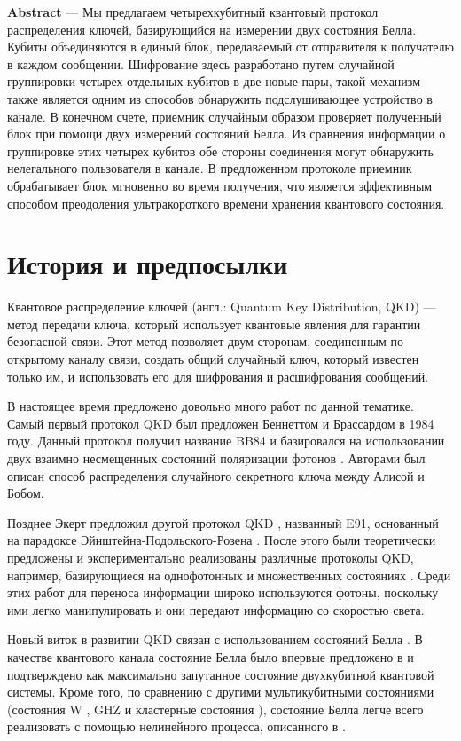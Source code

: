 \documentclass[a4paper,11pt]{article}
\author{Karamyshev}
\begin{document}
\textbf{Abstract} --- Мы предлагаем четырехкубитный квантовый протокол распределения ключей, базирующийся на измерении двух состояния Белла. Кубиты объединяются в единый блок, передаваемый от отправителя к получателю в каждом сообщении. Шифрование здесь разработано путем случайной группировки четырех отдельных кубитов в две новые пары, такой механизм также является одним из способов обнаружить подслушивающее устройство в канале. В конечном счете, приемник случайным образом проверяет полученный блок при помощи двух измерений состояний Белла. Из сравнения информации о группировке этих четырех кубитов обе стороны соединения могут обнаружить нелегального пользователя в канале. В предложенном протоколе приемник обрабатывает блок мгновенно во время получения, что является эффективным способом преодоления ультракороткого времени хранения квантового состояния.



\section{История и предпосылки}

Квантовое распределение ключей (англ.: Quantum Key Distribution, QKD) — метод передачи ключа, который использует квантовые явления для гарантии безопасной связи. Этот метод позволяет двум сторонам, соединенным по открытому каналу связи, создать общий случайный ключ, который известен только им, и использовать его для шифрования и расшифрования сообщений.


В настоящее время предложено довольно много работ по данной тематике. Самый первый протокол QKD был предложен Беннеттом и Брассардом в 1984 году. Данный протокол получил название BB84 и базировался на использовании двух взаимно несмещенных состояний поляризации фотонов \cite{BB84}. Авторами был описан способ распределения случайного секретного ключа между Алисой и Бобом. 
 
Позднее Экерт предложил другой протокол QKD \cite{E91}, названный E91, основанный на парадоксе Эйнштейна-Подольского-Розена \cite{EPR}. После этого были теоретически предложены и экспериментально реализованы различные протоколы QKD, например, базирующиеся на однофотонных \cite{liang2015simple} и множественных состояниях \cite{fourstate}. Среди этих работ для переноса информации широко используются фотоны, поскольку ими легко манипулировать и они передают информацию со скоростью света.

Новый виток в развитии QKD связан с использованием состояний Белла \cite{EPR}.
В качестве квантового канала состояние Белла было впервые предложено в \cite{Gao} и подтверждено \cite{bellstatescomp} как максимально запутанное состояние двухкубитной квантовой системы. Кроме того, по сравнению с другими мультикубитными состояниями (состояния W \cite{W}, GHZ \cite{GHZ} и кластерные состояния \cite{cluster}), состояние Белла легче всего реализовать с помощью нелинейного процесса, описанного в  \cite{twophotons}. 
\end{document}
